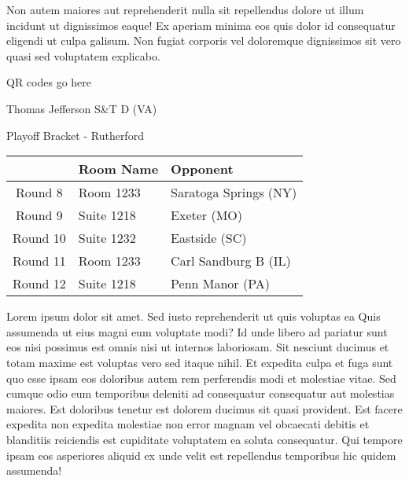 \documentclass{article}%
\begin{document}
\newline%
Non autem maiores aut reprehenderit nulla sit repellendus dolore ut illum incidunt ut dignissimos eaque! Ex aperiam minima eos quis dolor id consequatur eligendi ut culpa galisum. Non fugiat corporis vel doloremque dignissimos sit vero quasi sed voluptatem explicabo.\newline%
\newline%
%
\vspace*{30pt}%
\begin{center}%
\begin{Huge}%
QR codes go here%
\end{Huge}%
\end{center}%
\newpage%
\begin{center}%
\begin{Huge}%
Thomas Jefferson S\&T D (VA)%
\end{Huge}%
\vspace*{8pt}%
\linebreak%
\begin{Large}%
Playoff Bracket {-} Rutherford%
\end{Large}%
\end{center}%
\begin{tabularx}{\textwidth}{|c|Y|Y|}%
\hline%
&Room Name&Opponent\\%
\hline%
Round 8&Room 1233&Saratoga Springs (NY)\\%
Round 9&Suite 1218&Exeter (MO)\\%
Round 10&Suite 1232&Eastside (SC)\\%
Round 11&Room 1233&Carl Sandburg B (IL)\\%
Round 12&Suite 1218&Penn Manor (PA)\\%
\hline%
\end{tabularx}%
\vspace*{8pt}%
\linebreak%
\newline%
\newline%
Lorem ipsum dolor sit amet. Sed iusto reprehenderit ut quis voluptas ea Quis assumenda ut eius magni eum voluptate modi? Id unde libero ad pariatur sunt eos nisi possimus est omnis nisi ut internos laboriosam. Sit nesciunt ducimus et totam maxime est voluptas vero sed itaque nihil. Et expedita culpa et fuga sunt quo esse ipsam eos doloribus autem rem perferendis modi et molestiae vitae.\newline%
\newline%
Sed cumque odio eum temporibus deleniti ad consequatur consequatur aut molestias maiores. Est doloribus tenetur est dolorem ducimus sit quasi provident. Est facere expedita non expedita molestiae non error magnam vel obcaecati debitis et blanditiis reiciendis est cupiditate voluptatem ea soluta consequatur. Qui tempore ipsam eos asperiores aliquid ex unde velit est repellendus temporibus hic quidem assumenda!\newline%
\end{document}

